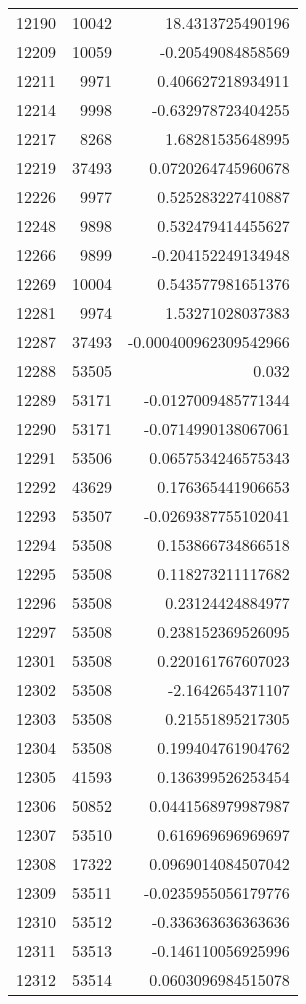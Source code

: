 \begin{tabular}{r | r | r}
12190 & 10042 & 18.4313725490196 \\
12209 & 10059 & -0.20549084858569 \\
12211 & 9971 & 0.406627218934911 \\
12214 & 9998 & -0.632978723404255 \\
12217 & 8268 & 1.68281535648995 \\
12219 & 37493 & 0.0720264745960678 \\
12226 & 9977 & 0.525283227410887 \\
12248 & 9898 & 0.532479414455627 \\
12266 & 9899 & -0.204152249134948 \\
12269 & 10004 & 0.543577981651376 \\
12281 & 9974 & 1.53271028037383 \\
12287 & 37493 & -0.000400962309542966 \\
12288 & 53505 & 0.032 \\
12289 & 53171 & -0.0127009485771344 \\
12290 & 53171 & -0.0714990138067061 \\
12291 & 53506 & 0.0657534246575343 \\
12292 & 43629 & 0.176365441906653 \\
12293 & 53507 & -0.0269387755102041 \\
12294 & 53508 & 0.153866734866518 \\
12295 & 53508 & 0.118273211117682 \\
12296 & 53508 & 0.23124424884977 \\
12297 & 53508 & 0.238152369526095 \\
12301 & 53508 & 0.220161767607023 \\
12302 & 53508 & -2.1642654371107 \\
12303 & 53508 & 0.21551895217305 \\
12304 & 53508 & 0.199404761904762 \\
12305 & 41593 & 0.136399526253454 \\
12306 & 50852 & 0.0441568979987987 \\
12307 & 53510 & 0.616969696969697 \\
12308 & 17322 & 0.0969014084507042 \\
12309 & 53511 & -0.0235955056179776 \\
12310 & 53512 & -0.336363636363636 \\
12311 & 53513 & -0.146110056925996 \\
12312 & 53514 & 0.0603096984515078 \\

\end{tabular}
